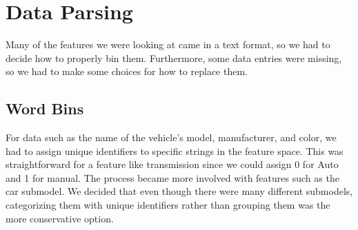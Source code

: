 \documentclass[paper=letter, fontsize=11pt]{scrartcl} %
\numberwithin{equation}{section} %
\begin{document}

\section{Data Parsing}
	Many of the features we were looking at came in a text format, so we had to decide how to properly bin them. Furthermore, some data entries were missing, so we had to make some choices for how to replace them.

\subsection{Word Bins}
	For data such as the name of the vehicle's model, manufacturer, and color, we had to assign unique identifiers to specific strings in the feature space. This was straightforward for a feature like transmission since we could assign 0 for Auto and 1 for manual. The process became more involved with features such as the car submodel. We decided that even though there were many different submodels, categorizing them with unique identifiers rather than grouping them was the more conservative option.
\end{document}
